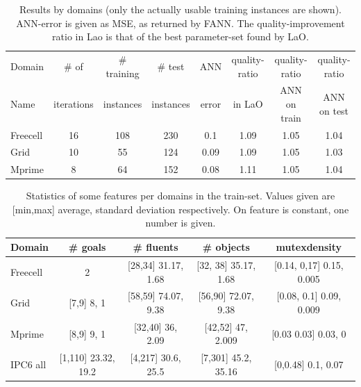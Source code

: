 \documentclass[letterpaper]{article}
\begin{document}
\begin{table}[ht]
\centering
\begin{tabular}{l c c c c c c c}
\hline\hline
Domain & \# of & \# training & \# test &  ANN & quality-ratio & quality-ratio & quality-ratio \\ 
Name & iterations  & instances &  instances &  error & in LaO & ANN on train & ANN on test \\ 
\hline
Freecell& 16 & 108 & 230 & 0.1 & 1.09 & 1.05 & 1.04  \\
Grid & 10 & 55 & 124 & 0.09 & 1.09 & 1.05 & 1.03  \\
Mprime & 8 & 64 & 152 & 0.08 & 1.11 & 1.05 & 1.04   \\
\hline
\end{tabular}
\caption{Results by domains (only the actually usable training instances are shown). ANN-error is given as MSE, as returned by FANN. The quality-improvement ratio in Lao is that of the best parameter-set found by LaO.}
\label{table:domains}
\end{table} 

 \begin{table}[ht]
\centering
\begin{tabular}{l c c c c }
\hline\hline
Domain &\# goals & \# fluents  & \# objects  & mutexdensity   \\ 
\hline
Freecell & 2 & [28,34] 31.17, 1.68  & [32, 38] 35.17, 1.68  & [0.14, 0,17] 0.15, 0.005     \\
Grid & [7,9] 8, 1  & [58,59] 74.07, 9.38 & [56,90] 72.07, 9.38  & [0.08, 0.1] 0.09, 0.009     \\
Mprime & [8,9] 9, 1 & [32,40] 36, 2.09  & [42,52] 47, 2.009 & [0.03 0.03] 0.03, 0     \\
IPC6 all& [1,110] 23.32, 19.2 & [4,217] 30.6, 25.5  & [7,301] 45.2, 35.16  & [0,0.48] 0.1, 0.07     \\
\hline
\end{tabular}
\caption{Statistics of some features per domains in the train-set. Values given are [min,max] average, standard deviation respectively. On feature is constant, one number is given.}
\label{table:statistics}
\end{table} 
\end{document}
